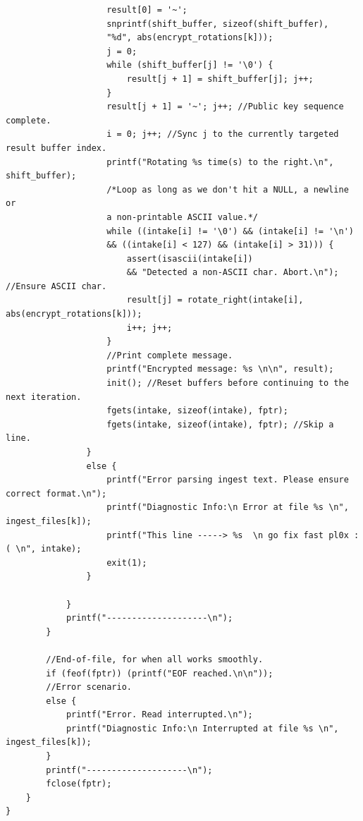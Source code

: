 \documentclass{article}
\begin{document}
\begin{verbatim}
                    result[0] = '~';
                    snprintf(shift_buffer, sizeof(shift_buffer),
                    "%d", abs(encrypt_rotations[k]));
                    j = 0;
                    while (shift_buffer[j] != '\0') {
                        result[j + 1] = shift_buffer[j]; j++;
                    }
                    result[j + 1] = '~'; j++; //Public key sequence complete.
                    i = 0; j++; //Sync j to the currently targeted result buffer index.
                    printf("Rotating %s time(s) to the right.\n", shift_buffer);
                    /*Loop as long as we don't hit a NULL, a newline or
                    a non-printable ASCII value.*/
                    while ((intake[i] != '\0') && (intake[i] != '\n')
                    && ((intake[i] < 127) && (intake[i] > 31))) {
                        assert(isascii(intake[i])
                        && "Detected a non-ASCII char. Abort.\n"); //Ensure ASCII char.
                        result[j] = rotate_right(intake[i], abs(encrypt_rotations[k]));
                        i++; j++;
                    }
                    //Print complete message.
                    printf("Encrypted message: %s \n\n", result);
                    init(); //Reset buffers before continuing to the next iteration.
                    fgets(intake, sizeof(intake), fptr);
                    fgets(intake, sizeof(intake), fptr); //Skip a line.
                }
                else {
                    printf("Error parsing ingest text. Please ensure correct format.\n");
                    printf("Diagnostic Info:\n Error at file %s \n", ingest_files[k]);
                    printf("This line -----> %s  \n go fix fast pl0x :( \n", intake);
                    exit(1);
                }

            }
            printf("--------------------\n");
        }

        //End-of-file, for when all works smoothly.
        if (feof(fptr)) (printf("EOF reached.\n\n"));
        //Error scenario.
        else {
            printf("Error. Read interrupted.\n");
            printf("Diagnostic Info:\n Interrupted at file %s \n", ingest_files[k]);
        }
        printf("--------------------\n");
        fclose(fptr);
    }
}


\end{verbatim}
\end{document}
